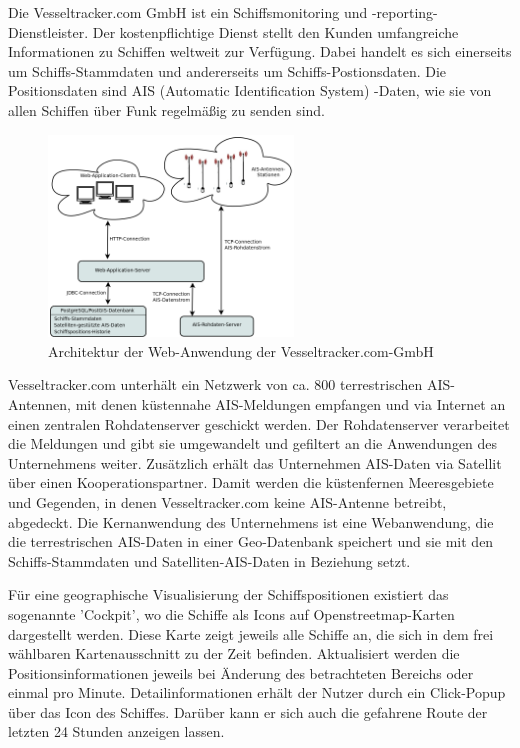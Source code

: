 Die Vesseltracker.com GmbH ist ein Schiffsmonitoring und -reporting-Dienstleister. Der kostenpflichtige Dienst stellt den Kunden umfangreiche Informationen zu Schiffen weltweit zur Verfügung. Dabei handelt es sich einerseits um Schiffs-Stammdaten und andererseits um Schiffs-Postionsdaten. Die Positionsdaten sind AIS (Automatic Identification System) -Daten, wie sie von allen Schiffen über Funk regelmäßig zu senden sind.

\begin{figure}
  \begin{center}
    \includegraphics[width=0.58\textwidth]{images/Exposee_graphik_Webapp}
  \end{center}
  \caption{Architektur der Web-Anwendung der Vesseltracker.com-GmbH}
\end{figure}

Vesseltracker.com unterhält ein Netzwerk von ca. 800 terrestrischen AIS-Antennen, mit denen küstennahe AIS-Meldungen empfangen und via Internet an einen zentralen Rohdatenserver geschickt werden. Der Rohdatenserver verarbeitet die Meldungen und gibt sie umgewandelt und gefiltert an die Anwendungen des Unternehmens weiter.
Zusätzlich erhält das Unternehmen AIS-Daten via Satellit über einen Kooperationspartner. Damit werden die küstenfernen Meeresgebiete und Gegenden, in denen Vesseltracker.com keine AIS-Antenne betreibt, abgedeckt.
Die Kernanwendung des Unternehmens ist eine Webanwendung, die die terrestrischen AIS-Daten in einer Geo-Datenbank speichert und sie mit den Schiffs-Stammdaten und Satelliten-AIS-Daten in Beziehung setzt.

Für eine geographische Visualisierung der Schiffspositionen existiert das sogenannte 'Cockpit', wo die Schiffe als Icons auf Openstreetmap-Karten dargestellt werden. Diese Karte zeigt jeweils alle Schiffe an, die sich in dem frei wählbaren Kartenausschnitt zu der Zeit befinden. Aktualisiert werden die Positionsinformationen jeweils bei Änderung des betrachteten Bereichs oder einmal pro Minute. Detailinformationen erhält der Nutzer durch ein Click-Popup über das Icon des Schiffes. Darüber kann er sich auch die gefahrene Route der letzten 24 Stunden anzeigen lassen.


